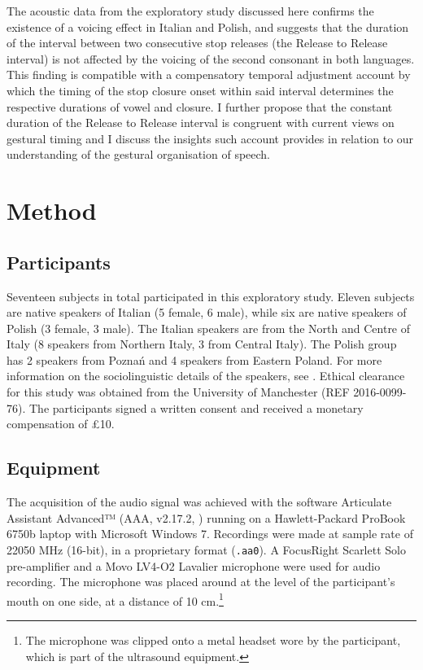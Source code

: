 \documentclass[preprint]{JASAnew}
\begin{document}
The acoustic data from the exploratory study discussed here confirms the
existence of a voicing effect in Italian and Polish, and suggests that
the duration of the interval between two consecutive stop releases (the
Release to Release interval) is not affected by the voicing of the
second consonant in both languages. This finding is compatible with a
compensatory temporal adjustment account by which the timing of the stop
closure onset within said interval determines the respective durations
of vowel and closure. I further propose that the constant duration of
the Release to Release interval is congruent with current views on
gestural timing \citep{goldstein2014} and I discuss the insights such
account provides in relation to our understanding of the gestural
organisation of speech.

\hypertarget{method}{%
\section{Method}\label{method}}

\label{s:method}

\hypertarget{participants}{%
\subsection{Participants}\label{participants}}

Seventeen subjects in total participated in this exploratory study.
Eleven subjects are native speakers of Italian (5 female, 6 male), while
six are native speakers of Polish (3 female, 3 male). The Italian
speakers are from the North and Centre of Italy (8 speakers from
Northern Italy, 3 from Central Italy). The Polish group has 2 speakers
from Poznań and 4 speakers from Eastern Poland. For more information on
the sociolinguistic details of the speakers, see .
Ethical clearance for this study was obtained from the University of
Manchester (REF 2016-0099-76). The participants signed a written consent
and received a monetary compensation of £10.

\hypertarget{equipment}{%
\subsection{Equipment}\label{equipment}}

The acquisition of the audio signal was achieved with the software
Articulate Assistant Advanced™ (AAA, v2.17.2, \citealt{articulate2011})
running on a Hawlett-Packard ProBook 6750b laptop with Microsoft Windows
7. Recordings were made at sample rate of 22050 MHz (16-bit), in a
proprietary format (\texttt{.aa0}). A FocusRight Scarlett Solo
pre-amplifier and a Movo LV4-O2 Lavalier microphone were used for audio
recording. The microphone was placed around at the level of the
participant's mouth on one side, at a distance of 10
cm.\footnote{The microphone was clipped onto a metal headset wore by the participant, which is part of the ultrasound equipment.}
\end{document}
